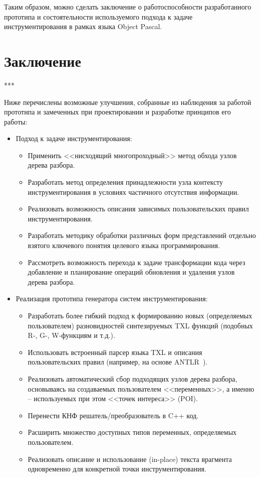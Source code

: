 Таким образом, можно сделать заключение о работоспособности разработанного прототипа и состоятельности используемого подхода к задаче инструментирования в рамках языка Object Pascal.

\section{Заключение}

***

Ниже перечислены возможные улучшения, собранные из наблюдения за работой прототипа и замеченных при проектировании и разработке принципов его работы:

\begin{itemize}[noitemsep]
  \item Подход к задаче инструментирования:
    \begin{itemize}[noitemsep]
        \item Применить <<нисходящий многопроходный>> метод обхода узлов дерева разбора.
        \item Разработать метод определения принадлежности узла контексту инструментирования в условиях частичного отсутствия информации.
        \item Реализовать возможность описания зависимых пользовательских правил инструментирования.
        \item Разработать методику обработки различных форм представлений отдельно взятого ключевого понятия целевого языка программирования.
        \item Рассмотреть возможность перехода к задаче трансформации кода через добавление и планирование операций обновления и удаления узлов дерева разбора.
    \end{itemize}

  \item Реализация прототипа генератора систем инструментирования:
    \begin{itemize}[noitemsep]
      \item Разработать более гибкий подход к формированию новых (определяемых пользователем) разновидностей синтезируемых TXL функций (подобных R-, G-, W-функциям и т.д.).
      \item Использовать встроенный парсер языка TXL и описания пользовательских правил (например, на основе ANTLR~\cite{antlr}).
      \item Реализовать автоматический сбор подходящих узлов дерева разбора, основываясь на создаваемых пользователем <<переменных>>, а именно -- используемых при этом <<точек интереса>> (POI).
      \item Перенести КНФ решатель/преобразователь в C++ код.
      \item Расширить множество доступных типов переменных, определяемых пользователем.
      \item Реализовать описание и использование (in-place) текста врагмента одновременно для конкретной точки инструментирования.
    \end{itemize}
\end{itemize}

